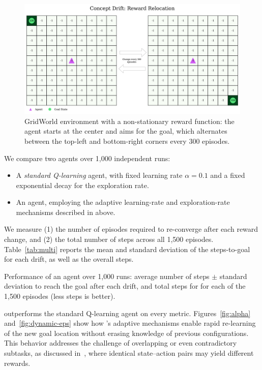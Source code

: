 \begin{figure}
    \centering
    \includegraphics[width=\textwidth]{figures/rewards_change.png}
    \caption{GridWorld environment with a non-stationary reward function: the agent starts at the center and aims for the goal, which alternates between the top-left and bottom-right corners every 300 episodes.}
    \label{fig:r-change}
\end{figure}

We compare two agents over 1,000 independent runs:  
\begin{itemize}
  \item A \emph{standard Q-learning} agent, with fixed learning rate $\alpha=0.1$ and a fixed exponential decay for the exploration rate.
  \item An \emph{\adaptiverl} agent, employing the adaptive learning-rate and exploration-rate mechanisms described in above.
\end{itemize}
We measure (1) the number of episodes required to re-converge after each reward change, and (2) the total number of steps across all 1,500 episodes. Table~\ref{tab:multi} reports the mean and standard deviation of the steps-to-goal for each drift, as well as the overall steps.  

\begin{table}
    \centering
    \caption{Performance of an agent over 1,000 runs: average number of steps $\pm$ standard deviation to reach the goal after each drift, and total steps for for each of the 1,500 episodes (less steps is better).}
    
    \label{tab:multi}
\end{table}

\adaptiverl outperforms the standard Q-learning agent on every metric. Figures~\ref{fig:alpha} and~\ref{fig:dynamic-eps} show how \adaptiverl’s adaptive mechanisms enable rapid re-learning of the new goal location without erasing knowledge of previous configurations. This behavior addresses the challenge of overlapping or even contradictory subtasks, as discussed in~\cite{Bagus2022}, where identical state–action pairs may yield different rewards.

